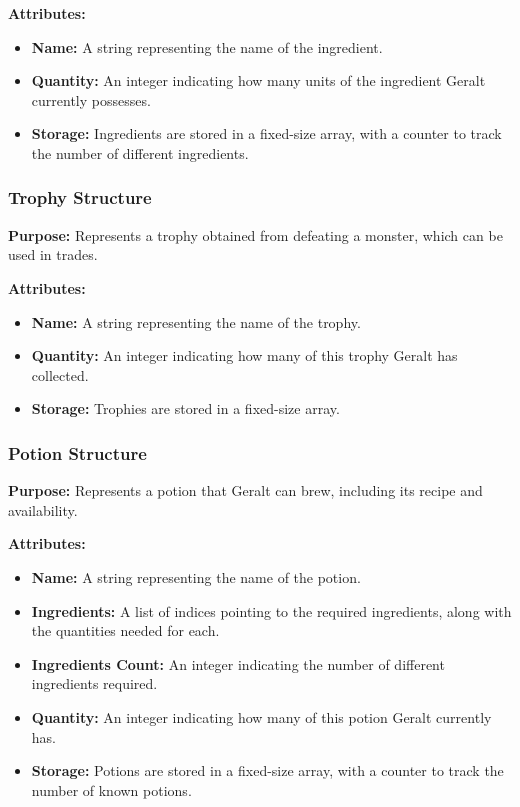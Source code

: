\documentclass{article}
\begin{document}
\textbf{Attributes:}
\begin{itemize}
    \item \textbf{Name:} A string representing the name of the ingredient.
    \item \textbf{Quantity:} An integer indicating how many units of the ingredient Geralt currently possesses.
    \item \textbf{Storage:} Ingredients are stored in a fixed-size array, with a counter to track the number of different ingredients.
\end{itemize}

\subsubsection*{Trophy Structure}
\textbf{Purpose:} Represents a trophy obtained from defeating a monster, which can be used in trades.

\textbf{Attributes:}
\begin{itemize}
    \item \textbf{Name:} A string representing the name of the trophy.
    \item \textbf{Quantity:} An integer indicating how many of this trophy Geralt has collected.
    \item \textbf{Storage:} Trophies are stored in a fixed-size array.
\end{itemize}

\subsubsection*{Potion Structure}
\textbf{Purpose:} Represents a potion that Geralt can brew, including its recipe and availability.

\textbf{Attributes:}
\begin{itemize}
    \item \textbf{Name:} A string representing the name of the potion.
    \item \textbf{Ingredients:} A list of indices pointing to the required ingredients, along with the quantities needed for each.
    \item \textbf{Ingredients Count:} An integer indicating the number of different ingredients required.
    \item \textbf{Quantity:} An integer indicating how many of this potion Geralt currently has.
    \item \textbf{Storage:} Potions are stored in a fixed-size array, with a counter to track the number of known potions.
\end{itemize}
\end{document}
